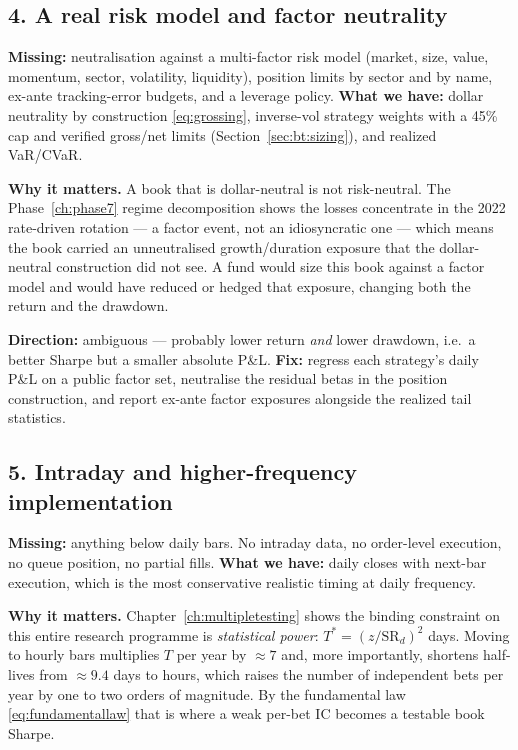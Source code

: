 \subsection{4. A real risk model and factor neutrality}

\textbf{Missing:} neutralisation against a multi-factor risk model (market, size, value,
momentum, sector, volatility, liquidity), position limits by sector and by name,
ex-ante tracking-error budgets, and a leverage policy.
\textbf{What we have:} dollar neutrality by construction
\eqref{eq:grossing}, inverse-vol strategy weights with a 45\% cap and verified gross/net
limits (Section~\ref{sec:bt:sizing}), and realized VaR/CVaR.

\textbf{Why it matters.} A book that is dollar-neutral is not risk-neutral. The
Phase~\ref{ch:phase7} regime decomposition shows the losses concentrate in the 2022
rate-driven rotation --- a factor event, not an idiosyncratic one --- which means the book
carried an unneutralised growth/duration exposure that the dollar-neutral construction did
not see. A fund would size this book against a factor model and would have reduced or
hedged that exposure, changing both the return and the drawdown.

\textbf{Direction:} ambiguous --- probably lower return \emph{and} lower drawdown, i.e.\ a
better Sharpe but a smaller absolute P\&L. \textbf{Fix:} regress each strategy's daily P\&L
on a public factor set, neutralise the residual betas in the position construction, and
report ex-ante factor exposures alongside the realized tail statistics.

\subsection{5. Intraday and higher-frequency implementation}

\textbf{Missing:} anything below daily bars. No intraday data, no order-level execution, no
queue position, no partial fills.
\textbf{What we have:} daily closes with next-bar execution, which is the most conservative
realistic timing at daily frequency.

\textbf{Why it matters.} Chapter~\ref{ch:multipletesting} shows the binding constraint on
this entire research programme is \emph{statistical power}: $T^\ast=(z/\mathrm{SR}_d)^2$
days. Moving to hourly bars multiplies $T$ per year by $\approx7$ and, more importantly,
shortens half-lives from $\approx9.4$ days to hours, which raises the number of independent
bets per year by one to two orders of magnitude. By the fundamental law
\eqref{eq:fundamentallaw} that is where a weak per-bet IC becomes a testable book Sharpe.

